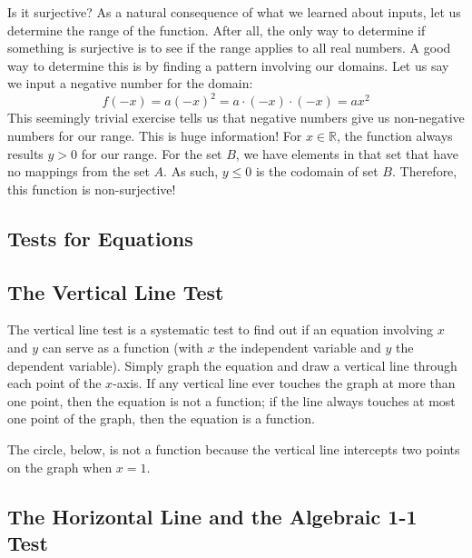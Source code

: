 Is it surjective? As a natural consequence of what we learned about inputs, let us
determine the range of the function. After all, the only way to determine if something is
surjective is to see if the range applies to all real numbers. A good way to determine
this is by finding a pattern involving our domains. Let us say we input a negative number
for the domain:
\[
f(-x) = a(-x)^2 = a \cdot (-x) \cdot (-x) = ax^2
\]
This seemingly trivial exercise tells us that negative numbers give us non-negative numbers for our range. This is huge information! For $x \in \mathbb{R}$, the function always results $y > 0$ for our range. For the set $B$, we have elements in that set that have no mappings from the set $A$. As such, $y \leq 0$ is the codomain of set $B$. Therefore, this function is non-surjective!

\subsection{Tests for Equations}
\label{sss:test-28db}

\subsection{The Vertical Line Test}
\label{sss:thev-18cb}

The vertical line test is a systematic test to find out if an equation involving $x$ and $y$ can serve as a function (with $x$ the independent variable and $y$ the dependent variable). Simply graph the equation and draw a vertical line through each point of the $x$-axis. If any vertical line ever touches the graph at more than one point, then the equation is not a function; if the line always touches at most one point of the graph, then the equation is a function.

The circle, below, is not a function because the vertical line intercepts two points on the graph when $x = 1$.


\subsection{The Horizontal Line and the Algebraic 1-1 Test}
\label{sss:theh-25b4}

